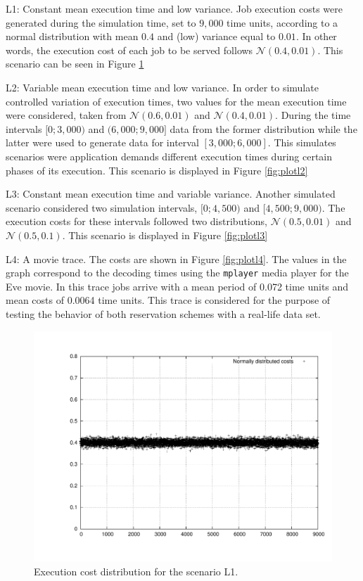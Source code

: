 \documentclass[times, 10pt,twocolumn]{article}
\begin{document}
\begin{description}
\item L1: Constant mean execution time and low variance. Job execution
  costs were generated during the simulation time, set to $9,000$ time
  units, according to a normal distribution with mean $0.4$ and (low)
  variance equal to $0.01$. In other words, the execution cost of each
  job to be served follows $\mathcal{N}(0.4,0.01)$. This scenario can
  be seen in Figure \ref{fig:plotl1}
\item L2: Variable mean execution time and low variance.  In order to
  simulate controlled variation of execution times, two values for the
  mean execution time were considered, taken from
  $\mathcal{N}(0.6,0.01)$ and $\mathcal{N}(0.4,0.01)$. During the time
  intervals $[0;3,000)$ and $(6,000;9,000]$ data from the former
  distribution while the latter were used to generate data for
  interval $[3,000;6,000]$. This simulates scenarios were application
  demands different execution times during certain phases of its
  execution. This scenario is displayed in Figure \ref{fig:plotl2}
\item L3: Constant mean execution time and variable variance.  Another
  simulated scenario considered two simulation intervals, $[0;4,500)$
  and $[4,500;9,000)$.  The execution costs for these intervals
  followed two distributions, $\mathcal{N}(0.5,0.01)$ and
  $\mathcal{N}(0.5,0.1)$. This scenario is displayed in Figure
  \ref{fig:plotl3}
\item L4: A movie trace. The costs are shown in Figure
  \ref{fig:plotl4}. The values in the graph correspond to the decoding
  times using the \texttt{mplayer} media player for the Eve movie. In
  this trace jobs arrive with a mean period of 0.072 time units and
  mean costs of 0.0064 time units. This trace is considered for the
  purpose of testing the behavior of both reservation schemes with a
  real-life data set.
\end{description}

\begin{figure}[h!t]
  \centering
  \includegraphics[scale=0.31]{trace-normal}
  \caption{Execution cost distribution for the scenario L1.}
  \label{fig:plotl1}
\end{figure}
\end{document}
